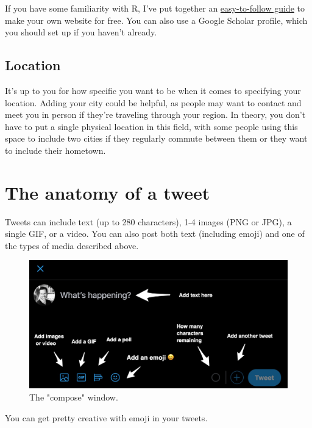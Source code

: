 \documentclass[
]{book}
\begin{document}
If you have some familiarity with R, I've put together an \href{https://www.dsquintana.blog/free-website-in-r-easy/}{easy-to-follow guide} to make your own website for free. You can also use a Google Scholar profile, which you should set up if you haven't already.

\hypertarget{location}{%
\subsection{Location}\label{location}}

It's up to you for how specific you want to be when it comes to specifying your location. Adding your city could be helpful, as people may want to contact and meet you in person if they're traveling through your region. In theory, you don't have to put a single physical location in this field, with some people using this space to include two cities if they regularly commute between them or they want to include their hometown.

\hypertarget{the-anatomy-of-a-tweet}{%
\section*{The anatomy of a tweet}\label{the-anatomy-of-a-tweet}}

Tweets can include text (up to 280 characters), 1-4 images (PNG or JPG), a single GIF, or a video. You can also post both text (including emoji) and one of the types of media described above.

\begin{figure}

\includegraphics[width=0.8\linewidth]{images/compose} \hfill{}

\caption{The "compose" window.}\label{fig:unnamed-chunk-6}
\end{figure}

You can get pretty creative with emoji in your tweets.
\end{document}
